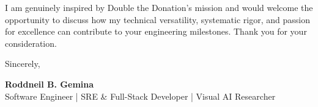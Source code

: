 \documentclass[letterpaper,11pt]{article}
\begin{document}
I am genuinely inspired by Double the Donation's mission and would welcome the opportunity to discuss how my technical versatility, systematic rigor, and passion for excellence can contribute to your engineering milestones. Thank you for your consideration.

Sincerely,

\vspace{12pt}
\textbf{Roddneil B. Gemina} \\
Software Engineer | SRE \& Full-Stack Developer | Visual AI Researcher
\end{document}
